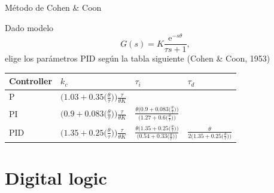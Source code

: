 \documentclass[presentation,aspectratio=169, usenames, dvipsnames]{beamer}
\begin{document}
\begin{frame}[label={sec:orgb52f960}]{Método de Cohen \& Coon}
\small

Dado modelo \[ G(s) = K \frac{\mathrm{e}^{-s\theta}}{\tau s + 1}, \]
elige los parámetros PID según la tabla siguiente (Cohen \& Coon, 1953)
   \begin{center}
   \setlength{\tabcolsep}{20pt}
   \renewcommand{\arraystretch}{1.5}
   \begin{tabular}{llll}
   Controller & \(k_c\) & \(\tau_i\) & \(\tau_d\)\\
  \hline\hline
  P & \(\Big(1.03 + 0.35\big(\frac{\theta}{\tau}\big)\Big)\frac{\tau}{\theta K}\) &  & \\
  PI &  \(\Big(0.9 + 0.083\big(\frac{\theta}{\tau}\big)\Big)\frac{\tau}{\theta K}\) & \(\frac{\theta\Big(0.9 + 0.083\big(\frac{\theta}{\tau}\big)\Big)}{\Big(1.27 + 0.6\big(\frac{\theta}{\tau}\big)\Big)}\) & \\
  PID &  \(\Big(1.35 + 0.25\big(\frac{\theta}{\tau}\big)\Big)\frac{\tau}{\theta K}\) &  \(\frac{\theta\Big(1.35 + 0.25\big(\frac{\theta}{\tau}\big)\Big)}{\Big(0.54 + 0.33\big(\frac{\theta}{\tau}\big)\Big)}\) & \(\frac{\theta}{2\Big(1.35 + 0.25\big(\frac{\theta}{\tau}\big)\Big)}\)\\
  \hline
\end{tabular}
\end{center}
\end{frame}

\section{Digital logic}
\label{sec:org374183d}
\end{document}
